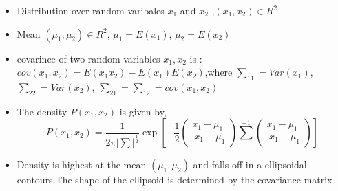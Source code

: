 \documentclass[12pt]{article}
\begin{document}
\begin{itemize}
\item	Distribution over random varibales $x_{1}$ and $x_{2}$ ,$(x_{1} ,  x_{2})\in R^{2}$
	
\item	Mean $(\mu_{1},\mu _{2}) \in R^{2}$,  $ \mu_{1}=E(x_{1})$,  $\mu_{2}=E(x_{2})$
	
\item	covarince of two random variables $x_{1},x_{2}$ is : $cov(x_{1},x_{2})=E(x_{1}x_{2})-E(x_{1})E(x_{2})$,where $\sum_{11}=Var(x_{1})$, $\sum_{22}=Var(x_{2})$, $\sum_{21}=\sum_{12}=cov(x_{1},x_{2})$
	
\item	The density $P(x_{1},x_{2})$ is given by, $$P(x_{1},x_{2})=\frac{1}{2\pi \vert \sum \vert ^{\frac{1}{2}}} \exp[-\frac{1}{2} \left({\begin{array}{cc}{x_{1}-\mu_{1}}\\\ {x_{1}-\mu_{1}}\end{array}}\right) \sum^{-1} \left({\begin{array}{cc}{x_{1}-\mu_{1}}\\\ {x_{1}-\mu_{1}}\end{array}}\right)]$$
	
\item Density is highest at the mean $(\mu_{1},\mu_{2})$ and falls off in a ellipsoidal contours.The shape of the ellipsoid is determined by the covariance matrix
	
	
	
	
	
\end{itemize}



















 
\end{document}
